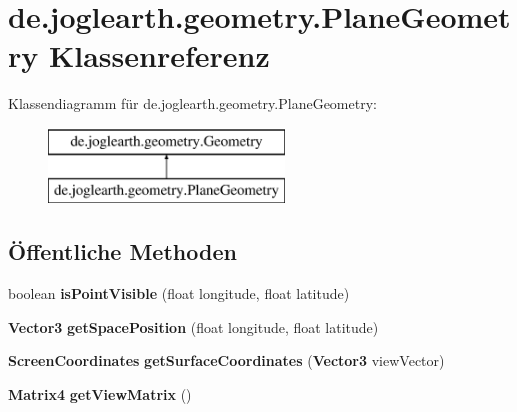 \section{de.\-joglearth.\-geometry.\-Plane\-Geometry \-Klassenreferenz}
\label{classde_1_1joglearth_1_1geometry_1_1_plane_geometry}
\-Klassendiagramm für de.\-joglearth.\-geometry.\-Plane\-Geometry\-:\begin{figure}[H]
\begin{center}
\leavevmode
\includegraphics[height=2.000000cm]{classde_1_1joglearth_1_1geometry_1_1_plane_geometry}
\end{center}
\end{figure}
\subsection*{Öffentliche \-Methoden}
\begin{DoxyCompactItemize}
\item 
boolean {\bfseries is\-Point\-Visible} (float longitude, float latitude)\label{classde_1_1joglearth_1_1geometry_1_1_plane_geometry_a66a12f3965886a1488a658e046e726fd}

\item 
{\bf \-Vector3} {\bfseries get\-Space\-Position} (float longitude, float latitude)\label{classde_1_1joglearth_1_1geometry_1_1_plane_geometry_a14b781123b2815a789ed1120d2b4bdeb}

\item 
{\bf \-Screen\-Coordinates} {\bfseries get\-Surface\-Coordinates} ({\bf \-Vector3} view\-Vector)\label{classde_1_1joglearth_1_1geometry_1_1_plane_geometry_a75b2822c69800fb287274d37ec397784}

\item 
{\bf \-Matrix4} {\bfseries get\-View\-Matrix} ()\label{classde_1_1joglearth_1_1geometry_1_1_plane_geometry_a27f961bb318adbeec26f5cb930a35877}

\end{DoxyCompactItemize}
